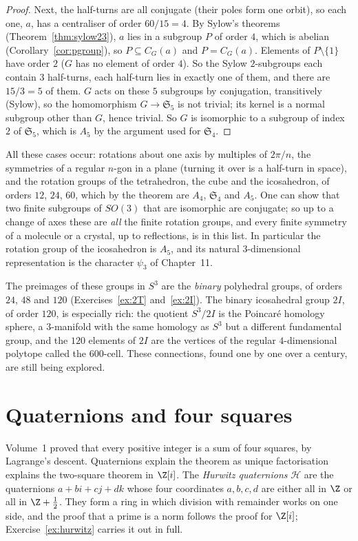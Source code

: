 \begin{proof}
Next, the half-turns are all conjugate (their poles form one orbit), so each one, $a$, has a centraliser of order $60/15=4$. By Sylow's theorems (Theorem~\ref{thm:sylow23}), $a$ lies in a subgroup $P$ of order $4$, which is abelian (Corollary~\ref{cor:pgroup}), so $P\subseteq C_G(a)$ and $P=C_G(a)$. Elements of $P\setminus\{1\}$ have order $2$ ($G$ has no element of order $4$). So the Sylow $2$-subgroups each contain $3$ half-turns, each half-turn lies in exactly one of them, and there are $15/3=5$ of them. $G$ acts on these $5$ subgroups by conjugation, transitively (Sylow), so the homomorphism $G\to\mathfrak S_5$ is not trivial; its kernel is a normal subgroup other than $G$, hence trivial. So $G$ is isomorphic to a subgroup of index $2$ of $\mathfrak S_5$, which is $A_5$ by the argument used for $\mathfrak S_4$.
\end{proof}

All these cases occur: rotations about one axis by multiples of $2\pi/n$, the symmetries of a regular $n$-gon in a plane (turning it over is a half-turn in space), and the rotation groups of the tetrahedron, the cube and the icosahedron, of orders $12$, $24$, $60$, which by the theorem are $A_4$, $\mathfrak S_4$ and $A_5$. One can show that two finite subgroups of $SO(3)$ that are isomorphic are conjugate; so up to a change of axes these are \emph{all} the finite rotation groups, and every finite symmetry of a molecule or a crystal, up to reflections, is in this list. In particular the rotation group of the icosahedron is $A_5$, and its natural $3$-dimensional representation is the character $\psi_3$ of Chapter~11.

The preimages of these groups in $S^3$ are the \emph{binary} polyhedral groups, of orders $24$, $48$ and $120$ (Exercises~\ref{ex:2T} and~\ref{ex:2I}). The binary icosahedral group $2I$, of order $120$, is especially rich: the quotient $S^3/2I$ is the Poincaré homology sphere, a $3$-manifold with the same homology as $S^3$ but a different fundamental group, and the $120$ elements of $2I$ are the vertices of the regular $4$-dimensional polytope called the $600$-cell. These connections, found one by one over a century, are still being explored.

\section{Quaternions and four squares}

Volume~1 proved that every positive integer is a sum of four squares, by Lagrange's descent. Quaternions explain the theorem as unique factorisation explains the two-square theorem in $\Z[i]$. The \emph{Hurwitz quaternions} $\mathcal H$ are the quaternions $a+bi+cj+dk$ whose four coordinates $a,b,c,d$ are either all in $\Z$ or all in $\Z+\frac12$.
They form a ring in which division with remainder works on one side, and the proof that a prime is a norm follows the proof for $\Z[i]$; Exercise~\ref{ex:hurwitz} carries it out in full.

